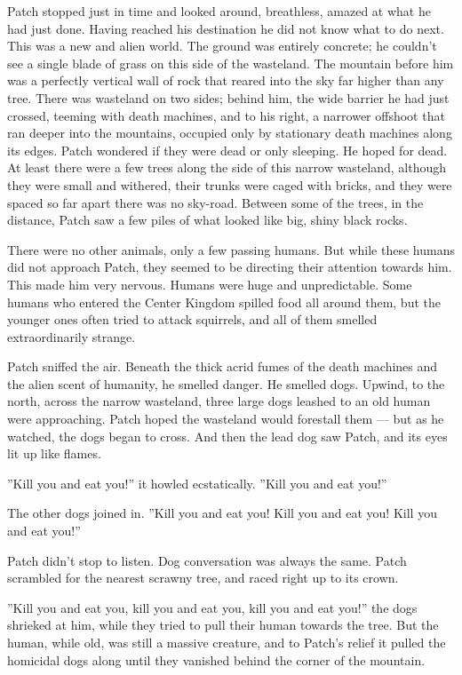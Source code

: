 \documentclass[12pt]{book}
\begin{document}
Patch stopped just in time and looked around, breathless, amazed at
what he had just done. Having reached his destination he did not know
what to do next. This was a new and alien world. The ground was
entirely concrete; he couldn't see a single blade of grass on this
side of the wasteland. The mountain before him was a perfectly
vertical wall of rock that reared into the sky far higher than any
tree. There was wasteland on two sides; behind him, the wide barrier
he had just crossed, teeming with death machines, and to his right, a
narrower offshoot that ran deeper into the mountains, occupied only by
stationary death machines along its edges. Patch wondered if they were
dead or only sleeping. He hoped for dead. At least there were a few
trees along the side of this narrow wasteland, although they were
small and withered, their trunks were caged with bricks, and they were
spaced so far apart there was no sky-road. Between some of the trees,
in the distance, Patch saw a few piles of what looked like big, shiny
black rocks.

There were no other animals, only a few passing humans. But while
these humans did not approach Patch, they seemed to be directing their
attention towards him. This made him very nervous. Humans were huge
and unpredictable. Some humans who entered the Center Kingdom spilled
food all around them, but the younger ones often tried to attack
squirrels, and all of them smelled extraordinarily strange.

Patch sniffed the air. Beneath the thick acrid fumes of the death
machines and the alien scent of humanity, he smelled danger. He
smelled dogs. Upwind, to the north, across the narrow wasteland, three
large dogs leashed to an old human were approaching. Patch hoped the
wasteland would forestall them --- but as he watched, the dogs began
to cross. And then the lead dog saw Patch, and its eyes lit up like
flames.

''Kill you and eat you!'' it howled ecstatically. ''Kill you and eat
you!''

The other dogs joined in. ''Kill you and eat you! Kill you and eat
you! Kill you and eat you!''

Patch didn't stop to listen. Dog conversation was always the
same. Patch scrambled for the nearest scrawny tree, and raced right up
to its crown.

''Kill you and eat you, kill you and eat you, kill you and eat you!''
the dogs shrieked at him, while they tried to pull their human towards
the tree. But the human, while old, was still a massive creature, and
to Patch's relief it pulled the homicidal dogs along until they
vanished behind the corner of the mountain.
\end{document}
